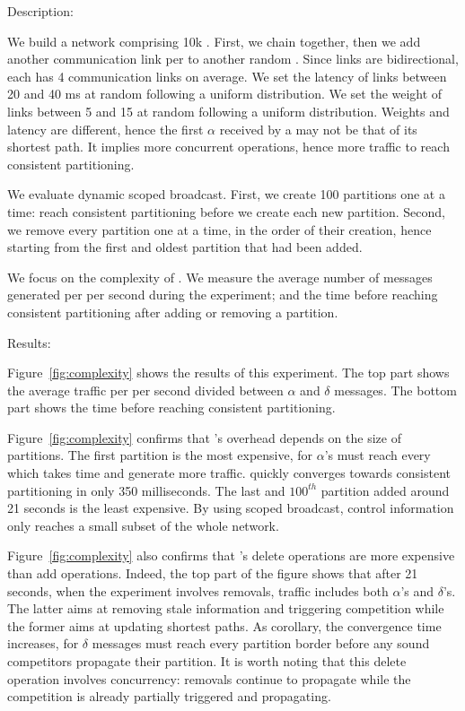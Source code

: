 \begin{asparadesc}
\item [Description:]

We build a network comprising 10k \processes. First, we chain
\processes together, then we add another communication link per
\process to another random \process. Since links are bidirectional,
each \process has 4 communication links on average. We set the latency
of links between 20 and 40 ms at random following a uniform
distribution. We set the weight of links between 5 and 15 at random
following a uniform distribution. Weights and latency are different,
hence the first $\alpha$ received by a \process may not be that of its
shortest path. It implies more concurrent operations, hence more
traffic to reach consistent partitioning.

\noindent We evaluate dynamic scoped broadcast. First, we create 100
partitions one at a time: \processes reach consistent partitioning
before we create each new partition. Second, we remove every partition
one at a time, in the order of their creation, hence starting from the
first and oldest partition that had been added.

\noindent We focus on the complexity of \NAME. We measure the average
number of messages generated per \process per second during the
experiment; and the time before reaching consistent partitioning after
adding or removing a partition.

\item [Results:]

Figure~\ref{fig:complexity} shows the results of this experiment. The
top part shows the average traffic per \process per second divided
between $\alpha$ and $\delta$ messages. The bottom part shows the time
before reaching consistent partitioning.

\noindent Figure~\ref{fig:complexity} confirms that \NAME's overhead
depends on the size of partitions. The first partition is the most
expensive, for $\alpha$'s must reach every \process which takes time
and generate more traffic.  \NAME quickly converges towards consistent
partitioning in only 350 milliseconds. The last and $100^{th}$
partition added around 21 seconds is the least expensive. By using
scoped broadcast, control information only reaches a small subset of
the whole network.

\noindent Figure~\ref{fig:complexity} also confirms that \NAME's
delete operations are more expensive than add operations. Indeed, the
top part of the figure shows that after 21 seconds, when the
experiment involves removals, traffic includes both $\alpha$'s and
$\delta$'s. The latter aims at removing stale information and
triggering competition while the former aims at updating shortest
paths. As corollary, the convergence time increases, for $\delta$
messages must reach every partition border before any sound
competitors propagate their partition. It is worth noting that this
delete operation involves concurrency: removals continue to propagate
while the competition is already partially triggered and propagating.


\end{asparadesc}
